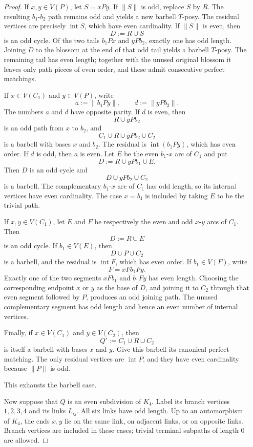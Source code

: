 \documentclass[preprint,12pt]{elsarticle}
\theoremstyle{plain}
\begin{document}
\begin{proof}
If \(x,y\in V(P)\), let \(S=xPy\). If \(\|S\|\) is odd, replace \(S\)
by \(R\). The resulting \(b_1\)-\(b_2\) path remains odd and yields a
new barbell \(T\)-posy. The residual vertices are precisely
\(\operatorname{int}S\), which have even cardinality. If \(\|S\|\) is
even, then
\[
D:=R\cup S
\]
is an odd cycle. Of the two tails \(b_1Px\) and \(yPb_2\), exactly one
has odd length. Joining \(D\) to the blossom at the end of that odd
tail yields a barbell \(T\)-posy. The remaining tail has even length;
together with the unused original blossom it leaves only path pieces
of even order, and these admit consecutive perfect matchings.

If \(x\in V(C_1)\) and \(y\in V(P)\), write
\[
a:=\|b_1Py\|,
\qquad
d:=\|yPb_2\|.
\]
The numbers \(a\) and \(d\) have opposite parity. If \(d\) is even,
then
\[
R\cup yPb_2
\]
is an odd path from \(x\) to \(b_2\), and
\[
C_1\cup R\cup yPb_2\cup C_2
\]
is a barbell with bases \(x\) and \(b_2\). The residual is
\(\operatorname{int}(b_1Py)\), which has even order. If \(d\) is odd,
then \(a\) is even. Let \(E\) be the even \(b_1\)-\(x\) arc of \(C_1\)
and put
\[
D:=R\cup yPb_1\cup E.
\]
Then \(D\) is an odd cycle and
\[
D\cup yPb_2\cup C_2
\]
is a barbell. The complementary \(b_1\)-\(x\) arc of \(C_1\) has odd
length, so its internal vertices have even cardinality. The case
\(x=b_1\) is included by taking \(E\) to be the trivial path.

If \(x,y\in V(C_1)\), let \(E\) and \(F\) be respectively the even and
odd \(x\)-\(y\) arcs of \(C_1\). Then
\[
D:=R\cup E
\]
is an odd cycle. If \(b_1\in V(E)\), then
\[
D\cup P\cup C_2
\]
is a barbell, and the residual is \(\operatorname{int}F\), which has
even order. If \(b_1\in V(F)\), write
\[
F=xFb_1Fy.
\]
Exactly one of the two segments \(xFb_1\) and \(b_1Fy\) has even
length. Choosing the corresponding endpoint \(x\) or \(y\) as the base
of \(D\), and joining it to \(C_2\) through that even segment followed
by \(P\), produces an odd joining path. The unused complementary
segment has odd length and hence an even number of internal vertices.

Finally, if \(x\in V(C_1)\) and \(y\in V(C_2)\), then
\[
Q':=C_1\cup R\cup C_2
\]
is itself a barbell with bases \(x\) and \(y\). Give this barbell its
canonical perfect matching. The only residual vertices are
\(\operatorname{int}P\), and they have even cardinality because
\(\|P\|\) is odd.

This exhausts the barbell case.

Now suppose that \(Q\) is an even subdivision of \(K_4\). Label its
branch vertices \(1,2,3,4\) and its links \(L_{ij}\). All six links
have odd length. Up to an automorphism of \(K_4\), the ends \(x,y\)
lie on the same link, on adjacent links, or on opposite links. Branch
vertices are included in these cases; trivial terminal subpaths of
length \(0\) are allowed.


\end{proof}
\end{document}
